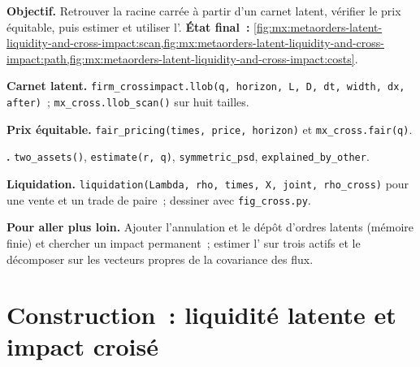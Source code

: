 \begin{tutorial}
\textbf{Objectif.} Retrouver la racine carrée à partir d'un carnet latent, vérifier le prix équitable, puis estimer et utiliser l'.
\textbf{État final~:} \cref{fig:mx:metaorders-latent-liquidity-and-cross-impact:scan,fig:mx:metaorders-latent-liquidity-and-cross-impact:path,fig:mx:metaorders-latent-liquidity-and-cross-impact:costs}.
\begin{tutsteps}
\item \textbf{Carnet latent.} \texttt{firm\_crossimpact.llob(q, horizon, L, D, dt, width, dx, after)}~; \texttt{mx\_cross.llob\_scan()} sur huit tailles.
\item \textbf{Prix équitable.} \texttt{fair\_pricing(times, price, horizon)} et \texttt{mx\_cross.fair(q)}.
\item \textbf{.} \texttt{two\_assets()}, \texttt{estimate(r, q)}, \texttt{symmetric\_psd}, \texttt{explained\_by\_other}.
\item \textbf{Liquidation.} \texttt{liquidation(Lambda, rho, times, X, joint, rho\_cross)} pour une vente et un trade de paire~; dessiner avec \texttt{fig\_cross.py}.
\end{tutsteps}
\textbf{Pour aller plus loin.} Ajouter l'annulation et le dépôt d'ordres latents (mémoire finie) et chercher un impact permanent~; estimer l' sur
trois actifs et le décomposer sur les vecteurs propres de la covariance des flux.
\end{tutorial}

\section{Construction~: liquidité latente et impact croisé}\label{bld:mx:metaorders-latent-liquidity-and-cross-impact:crossimpact}

